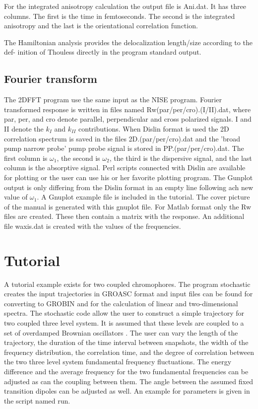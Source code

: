 For the integrated anisotropy calculation the output file is Ani.dat. It has three columns. The first is the time in femtoseconds. The second is the integrated anisotropy and the last is the orientational correlation function.

The Hamiltonian analysis provides the delocalization length/size according to the def- 
inition of Thouless \cite{Thouless.1974.PR.13.93} directly in the program standard output. 

\section{Fourier transform \label{sec:Fourier}}
The 2DFFT program use the same input as the NISE program.
Fourier transformed response is written in files named Rw(par/per/cro).(I/II).dat, where par, per, and cro denote parallel, perpendicular and cross polarized signals. I and II denote the $k_I$ and $k_{II}$ contributions. When Dislin format is used the 2D correlation spectrum is saved in the files 2D.(par/per/cro).dat and the 'broad pump narrow probe' pump probe signal is stored in PP.(par/per/cro).dat.
The first column is $\omega_1$, the second is $\omega_2$, the third is the dispersive signal, and the
last column is the absorptive signal. Perl scripts connected with Dislin are available for plotting or the
user can use his or her favorite plotting program.
The Gunplot output is only differing from the Dislin format in an empty line following ach new value of $\omega_1$. A Gnuplot example file is included in the tutorial. The cover picture 
of the manual is generated with this gnuplot file.
 For Matlab format only the Rw files are created. These
then contain a matrix with the response. An additional file waxis.dat is created with the values of the
frequencies.

\chapter{Tutorial}
A tutorial example exists for two coupled chromophores. The program stochastic creates the input
trajectories in GROASC format and input files can be found for converting to GROBIN and for the
calculation of linear and two-dimensional spectra. The stochastic code allow the user to construct
a simple trajectory for two coupled three level system. It is assumed that these levels are coupled
to a set of overdamped Brownian oscillators \cite{Mukamel.1995.B01}.
The user can vary the length of the trajectory, the duration of the time interval between snapshots, the 
width of the frequency distribution, the correlation time, and the degree of correlation between the
two three level system fundamental frequency fluctuations. The energy difference and the average frequency for the two fundamental frequencies can be adjusted as can the coupling between them.
The angle between the assumed fixed transition dipoles can be adjusted as well. An example for
parameters is given in the script named run. 

